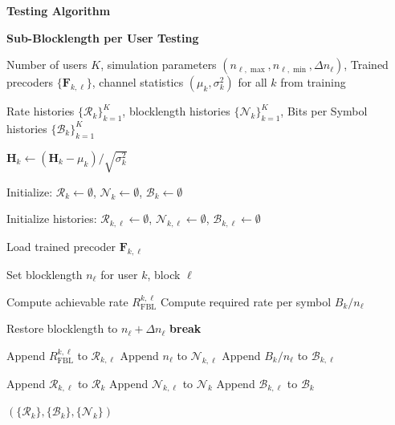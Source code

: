 \documentclass[a4paper, 12pt, onecolumn, journal, twoside, draftclsnofoot]{IEEEtran}
\begin{document}
\newpage


\textbf{Testing Algorithm}

\noindent\textbf{Sub-Blocklength per User Testing}

\begin{algorithmic}[1]

\Require
Number of users $K$, simulation parameters
$(n_{\ell,\max}, n_{\ell,\min}, \Delta n_\ell)$,
Trained precoders $\{\mathbf{F}_{k,\ell}\}$, channel statistics 
$(\mu_k, \sigma_k^2)$ for all $k$ from training

\Ensure
Rate histories $\{\mathcal{R}_k\}_{k=1}^K$,
blocklength histories $\{\mathcal{N}_{k}\}_{k=1}^K$,
Bits per Symbol histories $\{\mathcal{B}_{k}\}_{k=1}^K$


    \State $\mathbf{H}_k \gets (\mathbf{H}_k - \mu_k)/\sqrt{\sigma_k^2}$

    \State Initialize:
    $\mathcal{R}_k \gets \emptyset$,
    $\mathcal{N}_{k} \gets \emptyset$,
    $\mathcal{B}_{k} \gets \emptyset$


        \State Initialize histories:
        $\mathcal{R}_{k,\ell} \gets \emptyset$,
        $\mathcal{N}_{k,\ell} \gets \emptyset$,
        $\mathcal{B}_{k, \ell} \gets \emptyset$

        \State Load trained precoder $\mathbf{F}_{k,\ell}$


            \State Set blocklength $n_\ell$ for user $k$, block $\ell$

            \State Compute achievable rate $R_{\mathrm{FBL}}^{k,\ell}$
            \State Compute required rate per symbol $B_k / n_\ell$

                \Statex {}
                \State Restore blocklength to $n_\ell + \Delta n_\ell$
                \State \textbf{break}
            \EndIf

            \State Append $R_{\mathrm{FBL}}^{k,\ell}$ to $\mathcal{R}_{k,\ell}$
            \State Append $n_\ell$ to $\mathcal{N}_{k,\ell}$
            \State Append $B_k/n_\ell$ to $\mathcal{B}_{k, \ell}$

        \EndFor

        \State Append $\mathcal{R}_{k,\ell}$ to $\mathcal{R}_k$
        \State Append $\mathcal{N}_{k,\ell}$ to $\mathcal{N}_{k}$
        \State Append $\mathcal{B}_{k, \ell}$ to $\mathcal{B}_{k}$

    \EndFor

\EndFor

\State \Return $\left(\{\mathcal{R}_k\}, \{\mathcal{B}_{k}\}, \{\mathcal{N}_{k}\}\right)$

\end{algorithmic}
\end{document}
